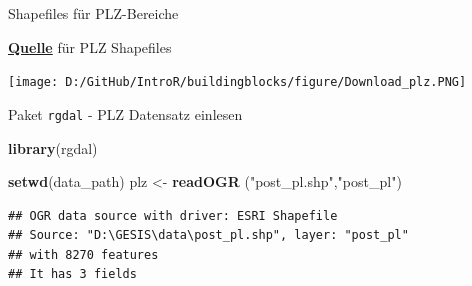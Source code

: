 \documentclass[ignorenonframetext,]{beamer}
\newenvironment{Shaded}{\begin{snugshade}}{\end{snugshade}}
\newcommand{\KeywordTok}[1]{\textcolor[rgb]{0.13,0.29,0.53}{\textbf{#1}}}
\newcommand{\NormalTok}[1]{#1}
\newcommand{\StringTok}[1]{\textcolor[rgb]{0.31,0.60,0.02}{#1}}
\begin{document}
\begin{frame}{Shapefiles für PLZ-Bereiche}
\protect\hypertarget{shapefiles-fur-plz-bereiche}{}

\begin{block}{\href{http://arnulf.us/PLZ}{\textbf{Quelle}} für PLZ
Shapefiles}

\texttt{[image: D:/GitHub/IntroR/buildingblocks/figure/Download\_plz.PNG]}

\end{block}

\end{frame}

\begin{frame}[fragile]{Paket \texttt{rgdal} - PLZ Datensatz einlesen}
\protect\hypertarget{paket-rgdal---plz-datensatz-einlesen}{}

\begin{Shaded}
\begin{Highlighting}[]
\KeywordTok{library}\NormalTok{(rgdal)}
\end{Highlighting}
\end{Shaded}

\begin{Shaded}
\begin{Highlighting}[]
\KeywordTok{setwd}\NormalTok{(data_path)}
\NormalTok{plz <-}\StringTok{ }\KeywordTok{readOGR}\NormalTok{ (}\StringTok{"post_pl.shp"}\NormalTok{,}\StringTok{"post_pl"}\NormalTok{)}
\end{Highlighting}
\end{Shaded}

\begin{verbatim}
## OGR data source with driver: ESRI Shapefile 
## Source: "D:\GESIS\data\post_pl.shp", layer: "post_pl"
## with 8270 features
## It has 3 fields
\end{verbatim}

\end{frame}
\end{document}
